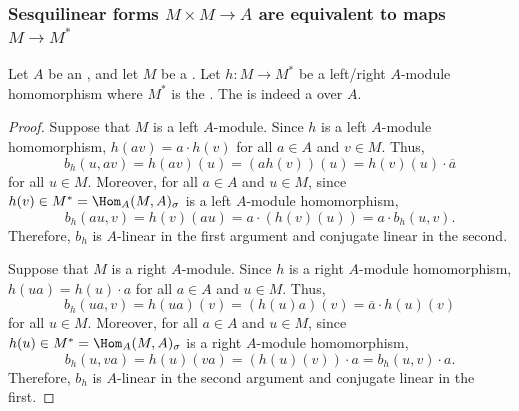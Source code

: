 




\subsubsection{Sesquilinear forms $M \times M \to A$ are equivalent to maps $M \to M^*$}




\begin{lemma} \label{lemma:sesquilinear_form_associated_to_a_homomorphsim_from_a_module_to_its_twisted_dual_is_indeeed_sesquilinear}
    Let $A$ be an , and let $M$ be a . 
    Let $h: M \to M^*$ be a left/right $A$-module homomorphism where $M^*$ is the . The  is indeed a  over $A$.
\end{lemma}
\begin{proof}
    Suppose that $M$ is a left $A$-module. Since $h$ is a left $A$-module homomorphism, $h(av) = a \cdot h(v)$ for all $a \in A$ and $v \in M$. Thus, 
    $$b_h(u,av) = h(av)(u) = (ah(v))(u) = h(v)(u) \cdot \overline{a}$$
    for all $u \in M$.
    Moreover, for all $a \in A$ and $u \in M$, since $h(v) \in M^* = \Hom_{A}(M, A)_\sigma$ is a left $A$-module homomorphism, 
    $$b_h(au,v) = h(v)(au) = a \cdot (h(v)(u)) = a \cdot b_h(u,v).$$
    Therefore, $b_h$ is $A$-linear in the first argument and conjugate linear in the second.

    Suppose that $M$ is a right $A$-module. Since $h$ is a right $A$-module homomorphism, $h(ua) = h(u) \cdot a$ for all $a \in A$ and $u \in M$. Thus, 
    $$b_h(ua,v) = h(ua)(v) = (h(u)a)(v) = \overline{a} \cdot h(u)(v)$$
    for all $u \in M$.
    Moreover, for all $a \in A$ and $u \in M$, since $h(u) \in M^* = \Hom_{A}(M, A)_\sigma$ is a right $A$-module homomorphism, 
    $$b_h(u,va) = h(u)(va) = (h(u)(v)) \cdot a =  b_h(u,v) \cdot a.$$
    Therefore, $b_h$ is $A$-linear in the second argument and conjugate linear in the first.
\end{proof}
